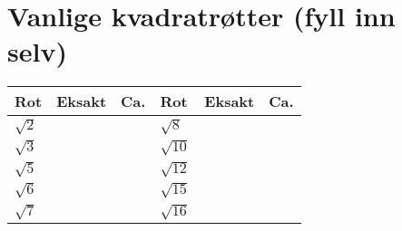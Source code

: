 \documentclass[11pt]{article}
\begin{document}
\section*{Vanlige kvadratr\o tter (fyll inn selv)}
\small
\begin{center}
\begin{tabular}{lrr@{\quad}lrr}
\toprule
\textbf{Rot} & \textbf{Eksakt} & \textbf{Ca.} & \textbf{Rot} & \textbf{Eksakt} & \textbf{Ca.} \\
\midrule
$\sqrt{2}$  & & & $\sqrt{8}$  & & \\
$\sqrt{3}$  & & & $\sqrt{10}$ & & \\
$\sqrt{5}$  & & & $\sqrt{12}$ & & \\
$\sqrt{6}$  & & & $\sqrt{15}$ & & \\
$\sqrt{7}$  & & & $\sqrt{16}$ & & \\
\bottomrule
\end{tabular}
\end{center}
\end{document}

